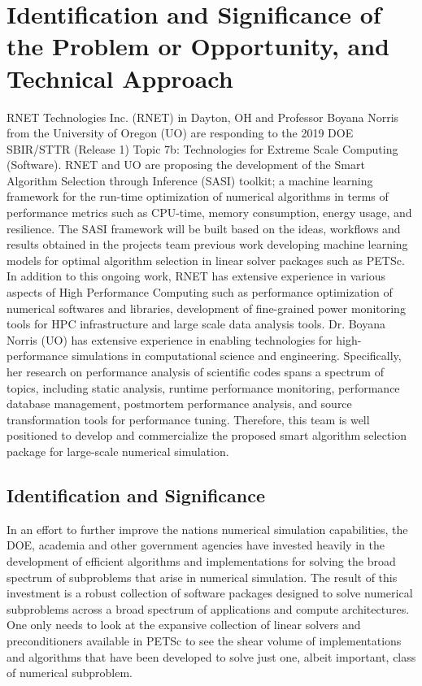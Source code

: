 \section{Identification and Significance of the Problem or Opportunity, and Technical Approach}

RNET Technologies Inc. (RNET) in Dayton, OH and Professor Boyana Norris from the University of Oregon (UO) are responding to the 2019 DOE 
SBIR/STTR (Release 1) Topic 7b: Technologies for Extreme Scale Computing (Software). RNET and UO are proposing the development of the Smart Algorithm Selection through Inference (SASI) toolkit; a machine learning framework for the run-time optimization of numerical algorithms in terms of performance metrics such as CPU-time, memory consumption, energy usage, and resilience. The SASI framework will be built based on the ideas, workflows and results obtained in the projects team previous work developing machine learning models for optimal algorithm selection in linear solver packages such as PETSc. In addition to this ongoing work, RNET has extensive experience in various aspects of High Performance Computing such as performance 
optimization of numerical softwares and libraries, development of fine-grained power monitoring tools 
for HPC infrastructure and large scale data analysis tools. Dr. Boyana Norris (UO) has extensive experience 
in enabling technologies for high-performance simulations in computational science and engineering. 
Specifically, her research on performance analysis of scientific codes spans a spectrum of topics, 
including static analysis, runtime performance monitoring, performance database management, postmortem 
performance analysis, and source transformation tools for performance tuning. Therefore, 
this team is well positioned to develop and commercialize the proposed smart algorithm selection package for 
large-scale numerical simulation. 


\subsection{Identification and Significance}
\label{sec:introduction}

In an effort to further improve the nations numerical simulation capabilities, the DOE, academia and other government agencies have invested heavily in the development of efficient algorithms and implementations for solving the broad spectrum of subproblems that arise in numerical simulation.  The result of this investment is a robust collection of software packages designed to solve numerical subproblems across a broad spectrum of applications and compute architectures. One only needs to look at the expansive collection of linear solvers and preconditioners available in PETSc to see the shear volume of implementations and algorithms that have been developed to solve just one, albeit important, class of numerical subproblem.  

